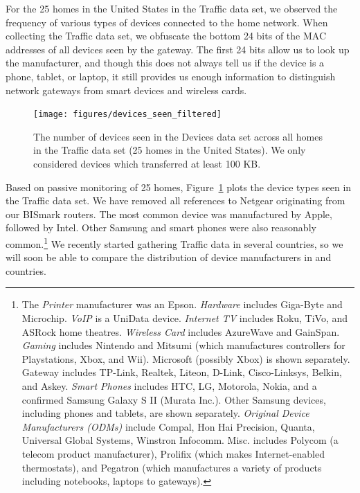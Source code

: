 For the 25 homes in the United States in the Traffic data set, we observed the
frequency of various types of devices connected to the home network. When
collecting the Traffic data set, we obfuscate the bottom 24 bits of the MAC
addresses of all devices seen by the gateway. The first 24 bits allow us to look
up the manufacturer, and though this does not always tell us if the device is a
phone, tablet, or laptop, it still provides us enough information to distinguish
network gateways from smart devices and wireless cards.

\begin{figure}[t!]
\texttt{[image: figures/devices\_seen\_filtered]}	
\caption{The number of devices seen in the Devices data set across
  all homes in the Traffic data set (25 homes in the United States).
  We only considered devices which transferred at least 100 KB. }
 \label{fig:manufacturer}
\end{figure}



Based on passive monitoring of 25 homes, Figure~\ref{fig:manufacturer} plots the
device types seen in the Traffic data set. We have removed all
references to Netgear originating from our BISmark routers. The most common device was manufactured by Apple, followed by Intel.  Other Samsung and smart phones
were also reasonably common.\footnote{ The {\em
  Printer} manufacturer was an Epson. {\em Hardware} includes Giga-Byte
and Microchip.  {\em VoIP} is a UniData device.  {\em Internet TV}
includes Roku, TiVo, and ASRock home theatres.  {\em Wireless Card}
includes AzureWave and GainSpan. {\em Gaming} includes Nintendo and
Mitsumi (which manufactures controllers for Playstations, Xbox, and
Wii).  Microsoft (possibly Xbox) is shown separately. Gateway includes
TP-Link, Realtek, Liteon, D-Link, Cisco-Linksys, Belkin, and Askey. {\em
  Smart Phones} includes HTC, LG, Motorola, Nokia, and a confirmed
Samsung Galaxy S II (Murata Inc.).  Other Samsung devices, including
phones and tablets, are shown separately.  {\em Original Device
  Manufacturers (ODMs)} include Compal, Hon Hai Precision, Quanta,
Universal Global Systems, Winstron Infocomm. Misc. includes Polycom (a
telecom product manufacturer), Prolifix (which makes Internet-enabled
thermostats), and Pegatron (which manufactures a variety of products
including notebooks, laptops to gateways).}  We recently started
gathering Traffic data in several \developing{} countries, so we will soon
be able to compare the distribution of device manufacturers in \developed{}
and \developing{} countries.
